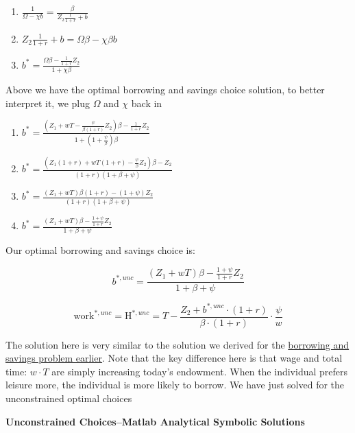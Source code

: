 \documentclass[
]{book}
\begin{document}
\begin{enumerate}
\def\labelenumi{\arabic{enumi}.}
\item
  \(\displaystyle \frac{1}{\Omega -\chi b}=\frac{\beta }{Z_2 \frac{1}{1+r}+b}\)
\item
  \(\displaystyle Z_2 \frac{1}{1+r}+b=\Omega \beta -\chi \beta b\)
\item
  \(\displaystyle b^{\ast } =\frac{\Omega \beta -\frac{1}{1+r}Z_2 }{1+\chi \beta }\)
\end{enumerate}

Above we have the optimal borrowing and savings choice solution, to
better interpret it, we plug \(\Omega\) and \(\chi\) back in

\begin{enumerate}
\def\labelenumi{\arabic{enumi}.}
\item
  \(\displaystyle b^{\ast } =\frac{\left(Z_1 +wT-\frac{\psi }{\beta (1+r)}Z_2 \right)\beta -\frac{1}{1+r}Z_2 }{1+\left(1+\frac{\psi }{\beta }\right)\beta }\)
\item
  \(\displaystyle b^{\ast } =\frac{\left(Z_1 (1+r)+wT(1+r)-\frac{\psi }{\beta }Z_2 \right)\beta -Z_2 }{\left(1+r\right)\left(1+\beta +\psi \right)}\)
\item
  \(\displaystyle b^{\ast } =\frac{\left(Z_1 +wT\right)\beta (1+r)-\left(1+\psi \right)Z_2 }{\left(1+r\right)\left(1+\beta +\psi \right)}\)
\item
  \(\displaystyle b^{\ast } =\frac{\left(Z_1 +wT\right)\beta -\frac{1+\psi }{1+r}Z_2 }{1+\beta +\psi }\)
\end{enumerate}

Our optimal borrowing and savings choice is:

\[b^{\ast ,unc} =\frac{\left(Z_1 +wT\right)\beta -\frac{1+\psi }{1+r}Z_2 }{1+\beta +\psi }\]

\[{\textrm{work}}^{\ast ,unc} ={\textrm{H}}^{\ast ,unc} =T-\frac{Z_2 +b^{\ast ,unc} \cdot (1+r)}{\beta \cdot (1+r)}\cdot \frac{\psi }{w}\]

The solution here is very similar to the solution we derived for the
\href{https://math4econ.github.io/optimization_application/household_c1_c2_constrained.html}{borrowing and savings problem
earlier}.
Note that the key difference here is that wage and total time:
\(w\cdot T\) are simply increasing today's endowment. When the individual
prefers leisure more, the individual is more likely to borrow. We have
just solved for the unconstrained optimal choices

\textbf{Unconstrained Choices--Matlab Analytical Symbolic Solutions}
\end{document}
